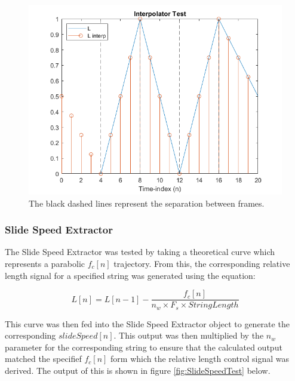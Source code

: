\documentclass[../main.tex]{subfiles}
\begin{document}
\begin{figure}[h]
    \centering
    \includegraphics[scale=.65]{./images/plots/InterpolatorTest.png}
    \caption{The black dashed lines represent the separation between frames.}
    \label{fig:InterpTest}
\end{figure}

\subsubsection {Slide Speed Extractor}
The Slide Speed Extractor was tested by taking a theoretical curve which represents a parabolic $f_c[n]$ trajectory. From this, the corresponding relative length signal for a specified string was generated using the equation:

\begin{equation}
    L[n] = L[n-1] - \frac{f_c[n]}{n_w \times F_s \times StringLength}
\end{equation}

This curve was then fed into the Slide Speed Extractor object to generate the corresponding $slideSpeed[n]$. This output was then multiplied by the $n_w$ parameter for the corresponding string to ensure that the calculated output matched the specifief $f_c[n]$ form which the relative length control signal was derived. The output of this is shown in figure \ref{fig:SlideSpeedTest} below.
\end{document}
